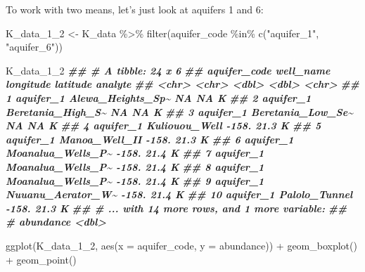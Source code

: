 \documentclass[
]{krantz}
\newenvironment{Shaded}{\begin{snugshade}}{\end{snugshade}}
\newcommand{\AttributeTok}[1]{\textcolor[rgb]{0.77,0.63,0.00}{#1}}
\newcommand{\DocumentationTok}[1]{\textcolor[rgb]{0.56,0.35,0.01}{\textbf{\textit{#1}}}}
\newcommand{\FunctionTok}[1]{\textcolor[rgb]{0.00,0.00,0.00}{#1}}
\newcommand{\NormalTok}[1]{#1}
\newcommand{\OtherTok}[1]{\textcolor[rgb]{0.56,0.35,0.01}{#1}}
\newcommand{\SpecialCharTok}[1]{\textcolor[rgb]{0.00,0.00,0.00}{#1}}
\newcommand{\StringTok}[1]{\textcolor[rgb]{0.31,0.60,0.02}{#1}}
\begin{document}
To work with two means, let's just look at aquifers 1 and 6:

\begin{Shaded}
\begin{Highlighting}[]
\NormalTok{K\_data\_1\_2 }\OtherTok{\textless{}{-}}\NormalTok{ K\_data }\SpecialCharTok{\%\textgreater{}\%}
    \FunctionTok{filter}\NormalTok{(aquifer\_code }\SpecialCharTok{\%in\%} \FunctionTok{c}\NormalTok{(}\StringTok{"aquifer\_1"}\NormalTok{, }\StringTok{"aquifer\_6"}\NormalTok{))}

\NormalTok{K\_data\_1\_2}
\DocumentationTok{\#\# \# A tibble: 24 x 6}
\DocumentationTok{\#\#    aquifer\_code well\_name         longitude latitude analyte}
\DocumentationTok{\#\#    \textless{}chr\textgreater{}        \textless{}chr\textgreater{}                 \textless{}dbl\textgreater{}    \textless{}dbl\textgreater{} \textless{}chr\textgreater{}  }
\DocumentationTok{\#\#  1 aquifer\_1    Alewa\_Heights\_Sp\textasciitilde{}       NA      NA   K      }
\DocumentationTok{\#\#  2 aquifer\_1    Beretania\_High\_S\textasciitilde{}       NA      NA   K      }
\DocumentationTok{\#\#  3 aquifer\_1    Beretania\_Low\_Se\textasciitilde{}       NA      NA   K      }
\DocumentationTok{\#\#  4 aquifer\_1    Kuliouou\_Well         {-}158.     21.3 K      }
\DocumentationTok{\#\#  5 aquifer\_1    Manoa\_Well\_II         {-}158.     21.3 K      }
\DocumentationTok{\#\#  6 aquifer\_1    Moanalua\_Wells\_P\textasciitilde{}     {-}158.     21.4 K      }
\DocumentationTok{\#\#  7 aquifer\_1    Moanalua\_Wells\_P\textasciitilde{}     {-}158.     21.4 K      }
\DocumentationTok{\#\#  8 aquifer\_1    Moanalua\_Wells\_P\textasciitilde{}     {-}158.     21.4 K      }
\DocumentationTok{\#\#  9 aquifer\_1    Nuuanu\_Aerator\_W\textasciitilde{}     {-}158.     21.4 K      }
\DocumentationTok{\#\# 10 aquifer\_1    Palolo\_Tunnel         {-}158.     21.3 K      }
\DocumentationTok{\#\# \# ... with 14 more rows, and 1 more variable:}
\DocumentationTok{\#\# \#   abundance \textless{}dbl\textgreater{}}

\FunctionTok{ggplot}\NormalTok{(K\_data\_1\_2, }\FunctionTok{aes}\NormalTok{(}\AttributeTok{x =}\NormalTok{ aquifer\_code, }\AttributeTok{y =}\NormalTok{ abundance)) }\SpecialCharTok{+}
    \FunctionTok{geom\_boxplot}\NormalTok{() }\SpecialCharTok{+}
    \FunctionTok{geom\_point}\NormalTok{()}
\end{Highlighting}
\end{Shaded}
\end{document}
